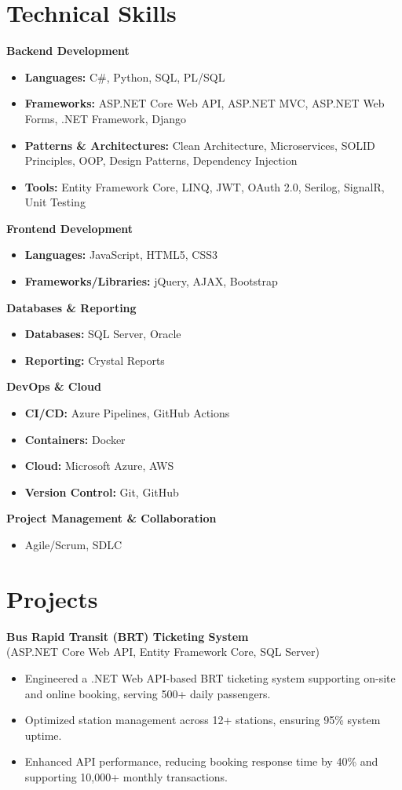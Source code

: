 \documentclass[11pt,a4paper]{article}
\begin{document}
\section*{Technical Skills}
\textbf{Backend Development}
\begin{itemize}
    \item \textbf{Languages:} C\#, Python, SQL, PL/SQL
    \item \textbf{Frameworks:} ASP.NET Core Web API, ASP.NET MVC, ASP.NET Web Forms, .NET Framework, Django
    \item \textbf{Patterns \& Architectures:} Clean Architecture, Microservices, SOLID Principles, OOP, Design Patterns, Dependency Injection
    \item \textbf{Tools:} Entity Framework Core, LINQ, JWT, OAuth 2.0, Serilog, SignalR, Unit Testing
\end{itemize}
\textbf{Frontend Development}
\begin{itemize}
    \item \textbf{Languages:} JavaScript, HTML5, CSS3
    \item \textbf{Frameworks/Libraries:} jQuery, AJAX, Bootstrap
\end{itemize}
\textbf{Databases \& Reporting}
\begin{itemize}
    \item \textbf{Databases:} SQL Server, Oracle
    \item \textbf{Reporting:} Crystal Reports
\end{itemize}
\textbf{DevOps \& Cloud}
\begin{itemize}
    \item \textbf{CI/CD:} Azure Pipelines, GitHub Actions
    \item \textbf{Containers:} Docker
    \item \textbf{Cloud:} Microsoft Azure, AWS
    \item \textbf{Version Control:} Git, GitHub
\end{itemize}
\textbf{Project Management \& Collaboration}
\begin{itemize}
    \item Agile/Scrum, SDLC
\end{itemize}

\section*{Projects}

\textbf{Bus Rapid Transit (BRT) Ticketing System} \\
(ASP.NET Core Web API, Entity Framework Core, SQL Server)
\begin{itemize}
    \item Engineered a .NET Web API-based BRT ticketing system supporting on-site and online booking, serving 500+ daily passengers.
    \item Optimized station management across 12+ stations, ensuring 95\% system uptime.
    \item Enhanced API performance, reducing booking response time by 40\% and supporting 10,000+ monthly transactions.
\end{itemize}
\end{document}
